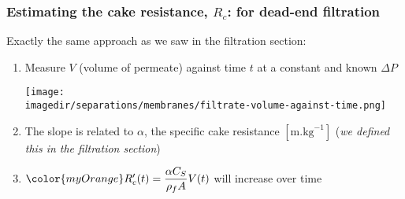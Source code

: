 \begin{frame}\frametitle{Estimating the cake resistance, $R_c$: {\color{red}for dead-end filtration}}
	Exactly the same approach as we saw in the filtration section:
	\begin{enumerate}
		\item	Measure $V$ (volume of permeate) against time $t$ at a constant and known $\Delta P$
		\begin{center}
			\texttt{[image: \\imagedir/separations/membranes/filtrate-volume-against-time.png]}
		\end{center}
		\item	The slope is related to $\alpha$, the specific cake resistance $[\text{m.kg}^{-1}]$ (\emph{we defined this in the filtration section})
		\item	${\color{myOrange}R'_c(t) = \dfrac{\alpha C_S }{\rho_f A} V(t)}$ will increase over time
	\end{enumerate}
\end{frame}

